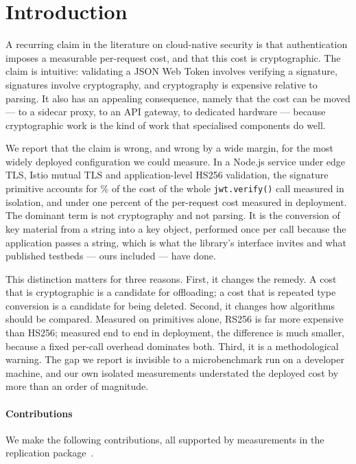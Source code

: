 \documentclass[pdflatex,sn-basic,twocolumn]{sn-jnl}
\begin{document}
\section{Introduction}\label{sec:intro}

A recurring claim in the literature on cloud-native security is that
authentication imposes a measurable per-request cost, and that this cost is
cryptographic. The claim is intuitive: validating a JSON Web Token involves
verifying a signature, signatures involve cryptography, and cryptography is
expensive relative to parsing. It also has an appealing consequence, namely that
the cost can be moved --- to a sidecar proxy, to an API gateway, to dedicated
hardware --- because cryptographic work is the kind of work that specialised
components do well.

We report that the claim is wrong, and wrong by a wide margin, for the most
widely deployed configuration we could measure. In a Node.js service under edge
TLS, Istio mutual TLS and application-level HS256 validation, the signature
primitive accounts for \MbHsHalfKbPrimitivePct\% of the cost of the whole
\texttt{jwt.verify()} call measured in isolation, and under one percent of the
per-request cost measured in deployment. The dominant term is not cryptography
and not parsing. It is the conversion of key material from a string into a key
object, performed once per call because the application passes a string, which
is what the library's interface invites and what published testbeds --- ours
included --- have done.

This distinction matters for three reasons. First, it changes the remedy. A cost
that is cryptographic is a candidate for offloading; a cost that is repeated
type conversion is a candidate for being deleted. Second, it changes how
algorithms should be compared. Measured on primitives alone, RS256 is far more
expensive than HS256; measured end to end in deployment, the difference is much
smaller, because a fixed per-call overhead dominates both. Third, it is a
methodological warning. The gap we report is invisible to a microbenchmark run
on a developer machine, and our own isolated measurements understated the
deployed cost by more than an order of magnitude.

\paragraph{Contributions} We make the following contributions, all supported by
measurements in the replication package~\cite{psaoartifact2026}.
\end{document}
